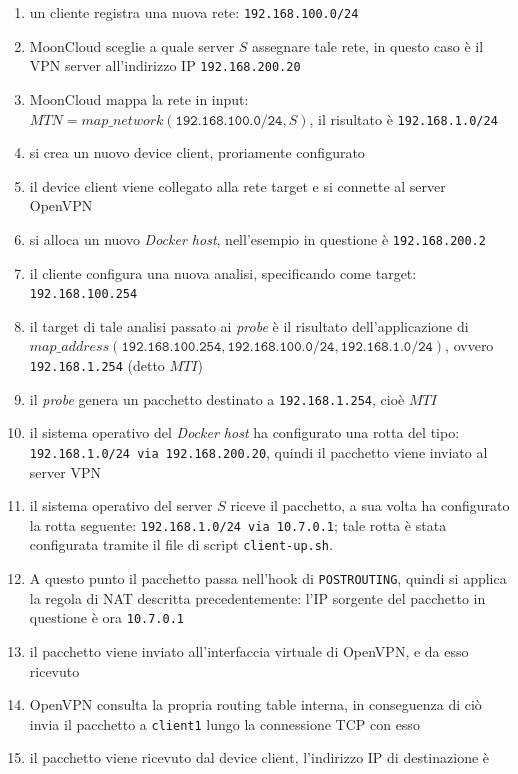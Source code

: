 	\begin{enumerate}
		\item un cliente registra una nuova rete: \texttt{192.168.100.0/24}
		\item MoonCloud sceglie a quale server $S$ assegnare tale rete,
		      in questo caso è il VPN server all'indirizzo IP \texttt{192.168.200.20}
		\item MoonCloud mappa la rete in input: $MTN=map\_network(\texttt{192.168.100.0/24}, S)$,
		      il risultato è \texttt{192.168.1.0/24}
		\item si crea un nuovo device client, proriamente configurato
		\item il device client viene collegato alla rete target e si connette al server OpenVPN
		\item si alloca un nuovo \textit{Docker host}, nell'esempio in questione è \texttt{192.168.200.2}
		\item il cliente configura una nuova analisi, specificando come target: \texttt{192.168.100.254}
		\item il target di tale analisi passato ai \textit{probe} è il risultato dell'applicazione
		      di $map\_address(\texttt{192.168.100.254}, \texttt{192.168.100.0/24}, \texttt{192.168.1.0/24})$,
		      ovvero \texttt{192.168.1.254} (detto $MTI$)
		\item il \textit{probe} genera un pacchetto destinato a \texttt{192.168.1.254}, cioè $MTI$
		\item il sistema operativo del \textit{Docker host} ha configurato una rotta del tipo:
		      \texttt{192.168.1.0/24 via 192.168.200.20}, quindi il pacchetto viene inviato al server VPN
		\item il sistema operativo del server $S$ riceve il pacchetto, a sua volta ha configurato
		      la rotta seguente: \texttt{192.168.1.0/24 via 10.7.0.1}; tale rotta è stata configurata
		      tramite il file di script \texttt{client-up.sh}.
		\item A questo punto il pacchetto passa nell'hook di \texttt{POSTROUTING}, quindi
		      si applica la regola di NAT descritta precedentemente: l'IP sorgente del
		      pacchetto in questione è ora \texttt{10.7.0.1}
		\item il pacchetto viene inviato all'interfaccia
		      virtuale di OpenVPN, e da esso ricevuto
		\item OpenVPN consulta la propria routing table interna, in conseguenza di ciò
		      invia il pacchetto a \texttt{client1} lungo la connessione TCP con esso
		\item il pacchetto viene ricevuto dal device client, l'indirizzo IP di destinazione è

\end{enumerate}
